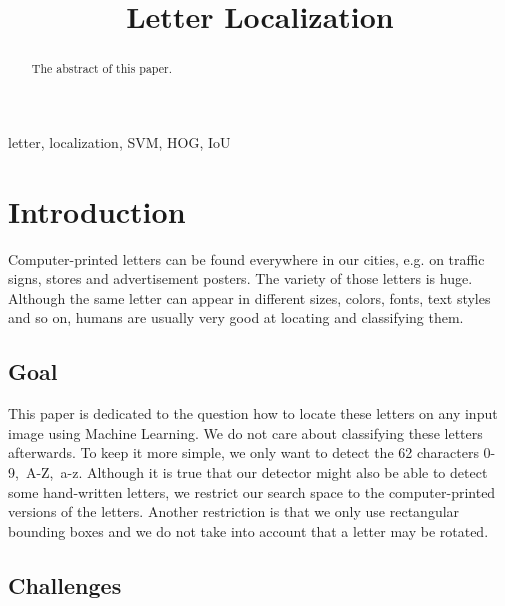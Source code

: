 \documentclass[conference]{IEEEtran}
\begin{document}
\title{Letter Localization}

\author{
}

\maketitle

\begin{abstract}
The abstract of this paper.
\end{abstract}

\begin{IEEEkeywords}
letter, localization, SVM, HOG, IoU
\end{IEEEkeywords}

\section{Introduction}\label{sec:intro}

Computer-printed letters can be found everywhere in our cities, e.g. on traffic signs, stores and advertisement posters. The variety of those letters is huge. Although the same letter can appear in different sizes, colors, fonts, text styles and so on, humans are usually very good at locating and classifying them.

\subsection{Goal}\label{sec:goals}

This paper is dedicated to the question how to locate these letters on any input image using Machine Learning. We do not care about classifying these letters afterwards. To keep it more simple, we only want to detect the 62 characters \mbox{0-9, A-Z, a-z}. Although it is true that our detector might also be able to detect some hand-written letters, we restrict our search space to the computer-printed versions of the letters. Another restriction is that we only use rectangular bounding boxes and we do not take into account that a letter may be rotated.

\subsection{Challenges}\label{sec:challenges}
\end{document}
